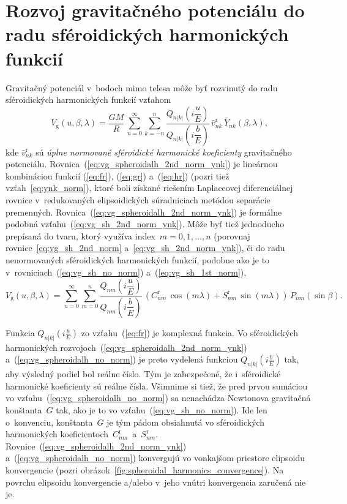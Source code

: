 \documentclass[a4paper, 12pt]{book}
\newcommand{\gidx}{\mathrm g}
\begin{document}
\section{Rozvoj gravitačného potenciálu do radu sféroidických harmonických 
funkcií}
\label{sec:spheroidal_harmonic_expansion}

Gravitačný potenciál v~bodoch mimo telesa môže byť rozvinutý do radu 
sféroidických harmonických funkcií vzťahom \parencite{MoritzPhysicalGeodesy}
%
\begin{equation}
\label{eq:vg_spheroidalh_2nd_norm_ynk}
V_\gidx(u, \beta, \lambda) = \frac{GM}{R} \, \sum_{n = 0}^\infty \sum_{k 
= -n}^n \frac{Q_{n|k|}\left( i \dfrac{u}{E} \right)}{Q_{n|k|}\left( 
i \dfrac{b}{E} \right)} \, \bar{v}^{\mathrm{r}}_{nk} \, \bar{Y}_{nk}(\beta, 
\lambda){,}
\end{equation}
%
kde $\bar{v}_{nk}^\mathrm{r}$ sú \emph{úplne normované sféroidické harmonické 
koeficienty} gravitačného potenciálu.  
Rovnica~(\ref{eq:vg_spheroidalh_2nd_norm_ynk}) je lineárnou kombináciou funkcií 
(\ref{eq:fr}), (\ref{eq:gr}) a~(\ref{eq:hr}) (pozri tiež 
vzťah~\ref{eq:ynk_norm}), ktoré boli získané riešením Laplaceovej 
diferenciálnej rovnice v~redukovaných elipsoidických súradniciach metódou 
separácie premenných.  Rovnica~(\ref{eq:vg_spheroidalh_2nd_norm_ynk}) je 
formálne podobná vzťahu~(\ref{eq:vg_sh_2nd_norm_ynk}).  Môže byť tiež 
jednoducho prepísaná do tvaru, ktorý využíva index~$m = 0, 1, \dots, n$ 
(porovnaj rovnice~\ref{eq:vg_sh_2nd_norm} a~\ref{eq:vg_sh_2nd_norm_ynk}), či do 
radu nenormovaných sféroidických harmonických funkcií, podobne ako je to 
v~rovniciach~(\ref{eq:vg_sh_no_norm}) a~(\ref{eq:vg_sh_1st_norm}),
%
\begin{equation}
\label{eq:vg_spheroidalh_no_norm}
V_\gidx(u, \beta, \lambda) = \sum_{n = 0}^\infty \sum_{m = 0}^n 
\frac{Q_{nm}\left( i \dfrac{u}{E} \right)}{Q_{nm}\left( i \dfrac{b}{E} \right)} 
\, \left( C^{\mathrm{r}}_{nm} \, \cos(m\lambda) + S^{\mathrm{r}}_{nm} \, 
\sin(m\lambda) \right) \, P_{nm}(\sin\beta){.}
\end{equation}

Funkcia $Q_{n|k|}\left( i \frac{u}{E} \right)$ zo vzťahu~(\ref{eq:fr}) je 
komplexná funkcia.  Vo sféroidických harmonických 
rozvojoch~(\ref{eq:vg_spheroidalh_2nd_norm_ynk}) 
a~(\ref{eq:vg_spheroidalh_no_norm}) je preto vydelená funkciou $Q_{n|k|}\left( 
i \frac{b}{E} \right)$ tak, aby výsledný podiel bol reálne číslo.  Tým je 
zabezpečené, že i~sféroidické harmonické koeficienty sú reálne čísla.  Všimnime 
si tiež, že pred prvou sumáciou vo vzťahu~(\ref{eq:vg_spheroidalh_no_norm}) sa 
nenachádza Newtonova gravitačná konštanta~$G$ tak, ako je to vo 
vzťahu~(\ref{eq:vg_sh_no_norm}).  Ide len o~konvenciu, konštanta~$G$ je tým 
pádom obsiahnutá vo sféroidických harmonických 
koeficientoch~$C_{nm}^\mathrm{r}$~a~$S_{nm}^\mathrm{r}$.  
Rovnice~(\ref{eq:vg_spheroidalh_2nd_norm_ynk}) 
a~(\ref{eq:vg_spheroidalh_no_norm}) konvergujú vo vonkajšom priestore elipsoidu 
konvergencie (pozri obrázok~\ref{fig:spheroidal_harmonics_convergence}).  Na 
povrchu elipsoidu konvergencie a/alebo v~jeho vnútri konvergencia zaručená nie 
je.
\end{document}
